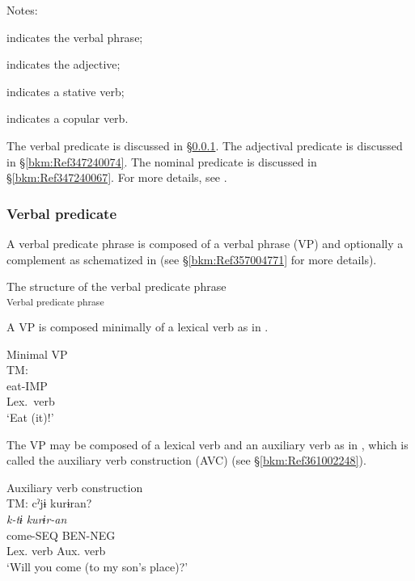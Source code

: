 Notes:\\
\begin{description}[font=\normalfont]
\item[“VP”]  indicates the verbal phrase;
\item[“A”]   indicates the adjective;
\item[“STV”] indicates a stative verb;
\item[“COP”] indicates a copular verb.
\end{description}
\z


The verbal predicate is discussed in §\ref{bkm:Ref365019761}. The adjectival predicate is discussed in §\ref{bkm:Ref347240074}. The nominal predicate is discussed in §\ref{bkm:Ref347240067}. For more details, see .

\subsubsection{Verbal predicate}
\label{bkm:Ref365019761}\hypertarget{RefHeadingToc395696995}{}
A verbal predicate phrase is composed of a verbal phrase (VP) and optionally a complement as schematized in  (see §\ref{bkm:Ref357004771} for more details).

\ea\label{ex:4.5}
The structure of the verbal predicate phrase\\
\textsubscript{Verbal predicate phrase}
\z

A VP is composed minimally of a lexical verb as in .

\ea\label{ex:4.6} Minimal VP\hfill\relax[Co: 120415\_01.txt]\\
TM: \\
    eat-IMP\\
    {Lex.\ verb}\\
\glt{} ‘Eat (it)!’
\z

The VP may be composed of a lexical verb and an auxiliary verb as in , which is called the auxiliary verb construction (AVC) (see §\ref{bkm:Ref361002248}).

\ea\label{ex:4.7} Auxiliary verb construction\hfill\relax[Co: 120415\_00.txt]\\
 {TM:} \gllll cˀjɨ  kurɨran?\\
   {\itshape k-tɨ}  {\itshape kurɨr-an}\\
   {come-SEQ}  {BEN-NEG}\\
   {Lex. verb}  {Aux. verb}\\
\glt{} ‘Will you come (to my son’s place)?’
\z


